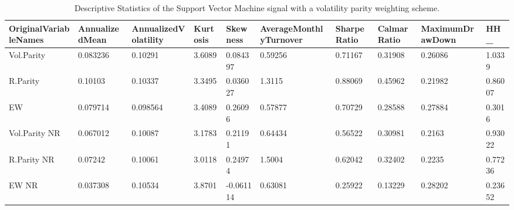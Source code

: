 \begin{table}[H]
\centering
\begin{tabular}{llllllllll}
OriginalVariableNames & AnnualizedMean & AnnualizedVolatility & Kurtosis & Skewness & AverageMonthlyTurnover & SharpeRatio & CalmarRatio & MaximumDrawDown & HH_ \\ 
\hline 
Vol.Parity & 0.083236 & 0.10291 & 3.6089 & 0.084397 & 0.59256 & 0.71167 & 0.31908 & 0.26086 & 1.0339 \\ 
R.Parity & 0.10103 & 0.10337 & 3.3495 & 0.036027 & 1.3115 & 0.88069 & 0.45962 & 0.21982 & 0.86007 \\ 
EW & 0.079714 & 0.098564 & 3.4089 & 0.26096 & 0.57877 & 0.70729 & 0.28588 & 0.27884 & 0.3016 \\ 
Vol.Parity NR & 0.067012 & 0.10087 & 3.1783 & 0.21191 & 0.64434 & 0.56522 & 0.30981 & 0.2163 & 0.93022 \\ 
R.Parity NR & 0.07242 & 0.10061 & 3.0118 & 0.24974 & 1.5004 & 0.62042 & 0.32402 & 0.2235 & 0.77236 \\ 
EW NR & 0.037308 & 0.10534 & 3.8701 & -0.061114 & 0.63081 & 0.25922 & 0.13229 & 0.28202 & 0.23652 \\ 
\hline
\end{tabular}
\caption{Descriptive Statistics of the Support Vector Machine signal with a volatility parity weighting scheme.}
\label{SVM_stats}
\end{table}